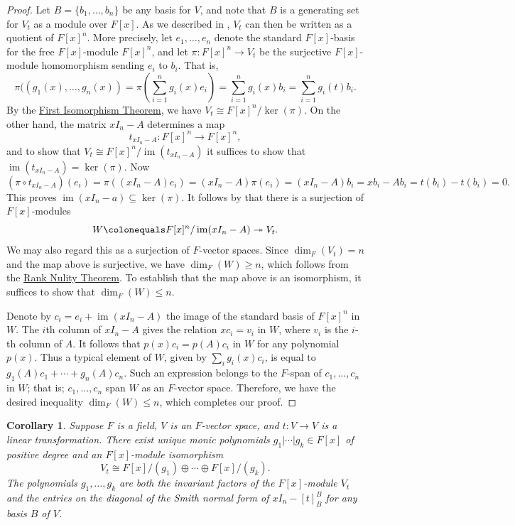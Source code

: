 \documentclass[12pt]{report}
\newtheorem{corollary}[theorem]{Corollary}
\numberwithin{equation}{section}
\numberwithin{theorem}{chapter}
\theoremstyle{definition}
\newtheorem*{basic properties}{Basic Properties}
\newtheorem*{Important Remark}{Important Remark}
\renewcommand{\ker}{\operatorname{ker}}
\DeclareMathOperator{\im}{im}
\begin{document}
\begin{proof} 
Let $B=\{b_1, \dots, b_n\}$ be any basis for $V$, and note that $B$ is a generating set for $V_t$ as a module over $F[x]$. As we described in , $V_t$ can then be written as a quotient of $F[x]^n$. More precisely, let $e_1, \dots, e_n$ denote the standard $F[x]$-basis for the free $F[x]$-module $F[x]^n$, and let $\pi\!: F[x]^n \to V_t$ be the surjective $F[x]$-module homomorphism sending $e_i$ to $b_i$. That is,
$$
\pi((g_1(x), \dots, g_n(x)) = \pi \left( \sum_{i=1}^n g_i(x) e_i \right) = \sum_{i=1}^n g_i(x) b_i = \sum_{i=1}^n g_i(t) b_i.
$$
By the \hyperref[first iso thm]{First Isomorphism Theorem}, we have $V_t\cong F[x]^n/\ker(\pi)$. On the other hand, the matrix $xI_n - A$ determines a map
$$t_{xI_n - A}: F[x]^n \to F[x]^n,$$
and to show that $V_t\cong F[x]^n/\im(t_{xI_n - A})$ it suffices to show  that $\im(t_{xI_n - A}) = \ker(\pi)$.
Now
$$(\pi \circ t_{xI_n - A})(e_i)=\pi((xI_n - A)e_i)=(xI_n - A)\pi(e_i)=(xI_n - A)b_i=xb_i-Ab_i=t(b_i)-t(b_i)=0.$$ 
This proves $\im(xI_n - a) \subseteq \ker(\pi)$. It follows by  that there is a surjection of $F[x]$-modules
$$W \colonequals F[x]^n/\im(xI_n - A) \twoheadrightarrow V_t.$$
We may also regard this as a surjection of $F$-vector spaces. Since $\dim_F(V_t) = n$ and the map above is surjective, we have $\dim_F(W)\geqslant n$, which follows from the \hyperref[rank nulity]{Rank Nulity Theorem}. To establish that the map above is an isomorphism, it suffices to show that $\dim_F(W) \leqslant n$. 

Denote by $c_i=e_i+\im(xI_n - A)$ the image of the standard basis of $F[x]^n$ in $W$.
The $i$th column of $xI_n - A$ gives the relation $x c_i = v_i$ in
$W$, where $v_i$ is the $i$-th column of $A$. It follows that $p(x) c_i = p(A) c_i$ in $W$ for any
polynomial $p(x)$. Thus a typical element of $W$, given by $\sum_i g_i(x) c_i$, is equal to $g_1(A) c_1 + \cdots + g_n(A) c_n$. Such an
expression belongs to the $F$-span of $c_1, \ldots, c_n$ in $W$; that is;
$c_1, \ldots, c_n$ span $W$ as an $F$-vector space. Therefore, we have the desired inequality  $\dim_F(W) \leqslant n$, which completes our proof.
\end{proof}



\begin{corollary}\label{cor:IFendo}
Suppose $F$ is a field, $V$ is an $F$-vector space, and $t\!:V\to V$ is a linear transformation. There exist unique monic polynomials $g_1 | \cdots | g_k \in F[x]$ of positive degree and an $F[x]$-module isomorphism 
$$V_{t} \cong F[x]/(g_1)\oplus \cdots \oplus F[x]/(g_k).$$ 
The polynomials $g_1,\ldots, g_k$ are both the invariant factors of the $F[x]$-module $V_{t}$ and the entries on the diagonal of the Smith normal form of $xI_n-[t]_B^B$ for any basis $B$ of $V$.
\end{corollary}
\end{document}
